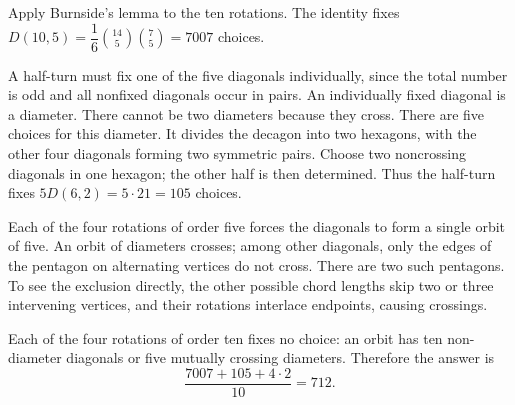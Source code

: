 Apply Burnside's lemma to the ten rotations. The identity fixes $D(10,5)=\dfrac{1}{6}\binom{14}{5}\binom75=7007$ choices.

A half-turn must fix one of the five diagonals individually, since the total number is odd and all nonfixed diagonals occur in pairs. An individually fixed diagonal is a diameter. There cannot be two diameters because they cross. There are five choices for this diameter. It divides the decagon into two hexagons, with the other four diagonals forming two symmetric pairs. Choose two noncrossing diagonals in one hexagon; the other half is then determined. Thus the half-turn fixes $5D(6,2)=5\cdot21=105$ choices.

Each of the four rotations of order five forces the diagonals to form a single orbit of five. An orbit of diameters crosses; among other diagonals, only the edges of the pentagon on alternating vertices do not cross. There are two such pentagons. To see the exclusion directly, the other possible chord lengths skip two or three intervening vertices, and their rotations interlace endpoints, causing crossings.

Each of the four rotations of order ten fixes no choice: an orbit has ten non-diameter diagonals or five mutually crossing diameters. Therefore the answer is
\[\boxed{\dfrac{7007+105+4\cdot2}{10}=712}.\]
